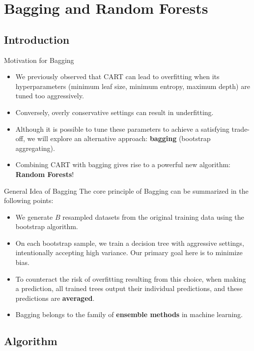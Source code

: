 \section[Bagging and Random Forests]{Bagging and Random Forests}

\subsection[Introduction]{Introduction}

\begin{frame}{Motivation for Bagging}
	\begin{itemize}
		\item We previously observed that CART can lead to overfitting when its hyperparameters (minimum leaf size, minimum entropy, maximum depth) are tuned too aggressively.
		\item Conversely, overly conservative settings can result in underfitting.
		\item Although it is possible to tune these parameters to achieve a satisfying trade-off, we will explore an alternative approach: \textbf{bagging} (bootstrap aggregating).
		\item Combining CART with bagging gives rise to a powerful new algorithm: \textbf{Random Forests}!
	\end{itemize}
\end{frame}

\begin{frame}{General Idea of Bagging}
	The core principle of Bagging can be summarized in the following points:
	\begin{itemize}
		\item We generate $B$ resampled datasets from the original training data using the bootstrap algorithm.
		\pause
		\item On each bootstrap sample, we train a decision tree with aggressive settings, intentionally accepting high variance. Our primary goal here is to minimize bias.
		\pause
		\item To counteract the risk of overfitting resulting from this choice, when making a prediction, all trained trees output their individual predictions, and these predictions are \textbf{averaged}.
		\pause
		\item Bagging belongs to the family of \textbf{ensemble methods} in machine learning.
	\end{itemize}
\end{frame}

\subsection[Algorithm]{Algorithm}

